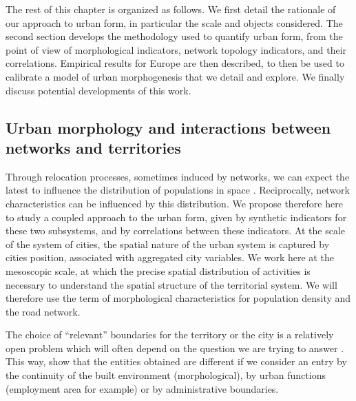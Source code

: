 The rest of this chapter is organized as follows. We first detail the rationale of our approach to urban form, in particular the scale and objects considered. The second section develops the methodology used to quantify urban form, from the point of view of morphological indicators, network topology indicators, and their correlations. Empirical results for Europe are then described, to then be used to calibrate a model of urban morphogenesis that we detail and explore. We finally discuss potential developments  of this work.


\subsection{Urban morphology and interactions between networks and territories}

Through relocation processes, sometimes induced by networks, we can expect the latest to influence the distribution of populations in space \citep{wegener2004land}. Reciprocally, network characteristics can be influenced by this distribution. We propose therefore here to study a coupled approach to the urban form, given by synthetic indicators for these two subsystems, and by correlations between these indicators. At the scale of the system of cities, the spatial nature of the urban system is captured by cities position, associated with aggregated city variables. We  work here at the mesoscopic scale, at which the precise spatial distribution of activities is necessary to understand the spatial structure of the territorial system. We will therefore use the term of morphological characteristics for population density and the road network.

The choice of ``relevant'' boundaries for the territory or the city is a relatively open problem which will often depend on the question we are trying to answer \citep{paez2005spatial}. This way, \cite{guerois2002commune} show that the entities obtained are different if we consider an entry by the continuity of the built environment (morphological), by urban functions (employment area for example) or by administrative boundaries. 


